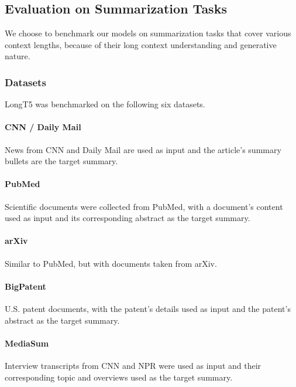 \documentclass[11pt]{article}
\begin{document}
\subsection{Evaluation on Summarization Tasks}
We choose to benchmark our models on summarization tasks that cover various context lengths, because of their long context understanding and generative nature.


\subsubsection{Datasets}\label{subsec:summarization-datasets}
LongT5 was benchmarked on the following six datasets. 
\vspace{-1mm}
\paragraph{CNN / Daily Mail} \cite{nallapati-etal-2016-abstractive} News from CNN and Daily Mail are used as input and the article's summary bullets are the target summary.
\vspace{-1mm}
\paragraph{PubMed}\cite{cohan-etal-2018-discourse} Scientific documents were collected from PubMed, with a document's content used as input and its corresponding abstract as the target summary.
\vspace{-1mm}
\paragraph{arXiv} \cite{cohan-etal-2018-discourse} Similar to PubMed, but with documents taken from arXiv.
\vspace{-1mm}
\paragraph{BigPatent} \cite{sharma-etal-2019-bigpatent} U.S. patent documents, with the patent's details used as input and the patent's abstract as the target summary.
\vspace{-1mm}
\paragraph{MediaSum} \cite{zhu-etal-2021-mediasum} Interview transcripts from CNN and NPR were used as input and their corresponding topic and overviews used as the target summary.
\vspace{-1mm}
\end{document}
